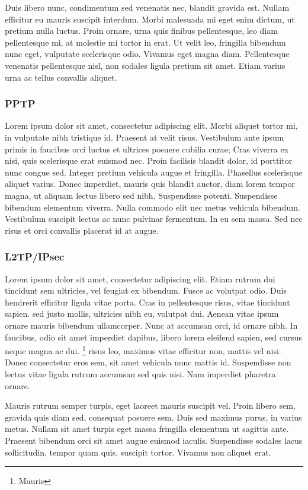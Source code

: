 \documentclass{report}
\begin{document}
Duis libero nunc, condimentum sed venenatis nec, blandit gravida est. Nullam efficitur eu mauris suscipit interdum. Morbi malesuada mi eget enim dictum, ut pretium nulla luctus. Proin ornare, urna quis finibus pellentesque, leo diam pellentesque mi, at molestie mi tortor in erat. Ut velit leo, fringilla bibendum nunc eget, vulputate scelerisque odio. Vivamus eget magna diam. Pellentesque venenatis pellentesque nisl, non sodales ligula pretium sit amet. Etiam varius urna ac tellus convallis aliquet.

\subsubsection{PPTP}

Lorem ipsum dolor sit amet, consectetur adipiscing elit. Morbi aliquet tortor mi, in vulputate nibh tristique id. Praesent at velit risus. Vestibulum ante ipsum primis in faucibus orci luctus et ultrices posuere cubilia curae; Cras viverra ex nisi, quis scelerisque erat euismod nec. Proin facilisis blandit dolor, id porttitor nunc congue sed. Integer pretium vehicula augue et fringilla. Phasellus scelerisque aliquet varius. Donec imperdiet, mauris quis blandit auctor, diam lorem tempor magna, ut aliquam lectus libero sed nibh. Suspendisse potenti. Suspendisse bibendum elementum viverra. Nulla commodo elit nec metus vehicula bibendum. Vestibulum suscipit lectus ac nunc pulvinar fermentum. In eu sem massa. Sed nec risus et orci convallis placerat id at augue.

\subsubsection{L2TP/IPsec}
Lorem ipsum dolor sit amet, consectetur adipiscing elit. Etiam rutrum dui tincidunt sem ultricies, vel feugiat ex bibendum. Fusce ac volutpat odio. Duis hendrerit efficitur ligula vitae porta. Cras in pellentesque risus, vitae tincidunt sapien. sed justo mollis, ultricies nibh eu, volutpat dui. Aenean vitae ipsum ornare mauris bibendum ullamcorper. Nunc at accumsan orci, id ornare nibh. In faucibus, odio sit amet imperdiet dapibus, libero lorem eleifend sapien, sed cursus neque magna ac dui. \footnote{Mauris} risus leo, maximus vitae efficitur non, mattis vel nisi. Donec consectetur eros sem, sit amet vehicula nunc mattis id. Suspendisse non lectus vitae ligula rutrum accumsan sed quis nisi. Nam imperdiet pharetra ornare.

Mauris rutrum semper turpis, eget laoreet mauris suscipit vel. Proin libero sem, gravida quis diam sed, consequat posuere sem. Duis sed maximus purus, in varius metus. Nullam sit amet turpis eget massa fringilla elementum ut sagittis ante. Praesent bibendum orci sit amet augue euismod iaculis. Suspendisse sodales lacus sollicitudin, tempor quam quis, suscipit tortor. Vivamus non aliquet erat.
\end{document}
